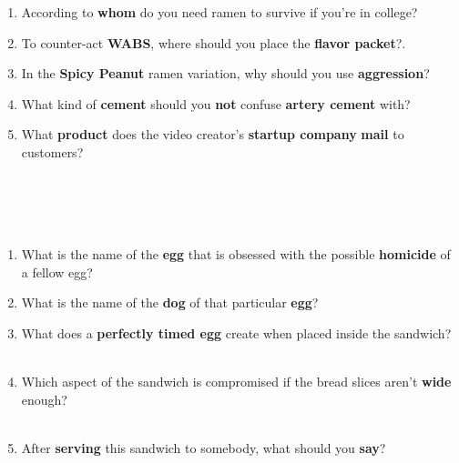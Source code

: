 \documentclass[letterpaper,12pt]{article}
\begin{document}
 \vspace{-.3in} 


\begin{enumerate}[label=(\roman*)]
	\setlength{\itemsep}{2em}
	\item According to {\bf whom} do you need ramen to survive if you're in college? \fillspace{2in}
	\item To counter-act \textbf{WABS}, where should you place the \textbf{flavor packet}?. \fillspace{2in}
	\item In the \textbf{Spicy Peanut} ramen variation, why should you use {\bf aggression}? \fillspace{2in}
	\item  What kind of \textbf{cement} should you {\bf not} confuse {\bf artery cement} with? \fillspace{2in}
	\item What \textbf{product} does the video creator's \textbf{startup company} \textbf{mail} to customers? \fillspace{1.8in}  \\ \ \\ \fillspace{2in} \\ \ \\ \  \fillspace{2in}
\end{enumerate}

 \vspace{-.3in} 

\begin{enumerate}[label=(\roman*)]
	\setlength{\itemsep}{2em}

	\item What is the name of the \textbf{egg} that is obsessed with the possible \textbf{homicide} of a fellow egg? \fillspace{1.0in} 
	\item What is the name of the {\bf dog} of that particular {\bf egg}? \fillspace{2in} 
	\item What does a {\bf perfectly timed egg} create when placed inside the sandwich? \fillspace{2in} \\ \ \\ \fillspace{2in}
	\item Which aspect of the sandwich is compromised if the bread slices aren't {\bf wide} enough? \fillspace{1.5in} \\ \ \\ \fillspace{2in} 
	\item After \textbf{serving} this sandwich to somebody, what should you \textbf{say}? \fillspace{2.4in} 
\end{enumerate}
\end{document}
